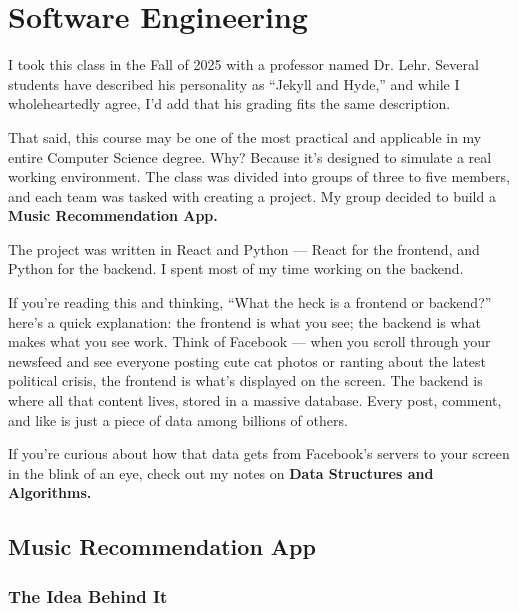 \chapter{Software Engineering}

I took this class in the Fall of 2025 with a professor named Dr. Lehr. Several students have described his personality as “Jekyll and Hyde,” and while I wholeheartedly agree, I’d add that his grading fits the same description.

That said, this course may be one of the most practical and applicable in my entire Computer Science degree. Why? Because it’s designed to simulate a real working environment. The class was divided into groups of three to five members, and each team was tasked with creating a project. My group decided to build a
\textbf{Music Recommendation App.}

The project was written in React and Python — React for the frontend, and Python for the backend. I spent most of my time working on the backend.

If you’re reading this and thinking, “What the heck is a frontend or backend?” here’s a quick explanation: the frontend is what you see; the backend is what makes what you see work. Think of Facebook — when you scroll through your newsfeed and see everyone posting cute cat photos or ranting about the latest political crisis, the frontend is what’s displayed on the screen. The backend is where all that content lives, stored in a massive database. Every post, comment, and like is just a piece of data among billions of others.

If you’re curious about how that data gets from Facebook’s servers to your screen in the blink of an eye, check out my notes on \textbf{Data Structures and Algorithms.}


\section{Music Recommendation App}
\subsection{The Idea Behind It}

